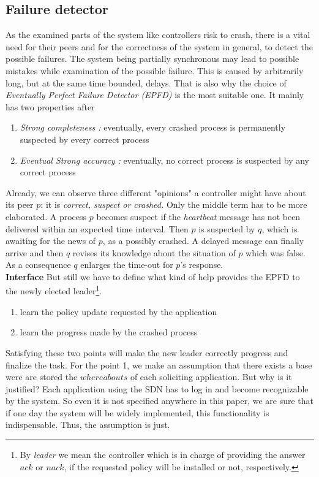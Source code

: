 \documentclass{article}
\theoremstyle{remark}
\begin{document}
\subsection{Failure detector}
As the examined parts of the system like controllers risk to crash, there is a vital need for their peers and for the correctness of the system in general, to detect the possible failures. The system being partially synchronous may lead to possible mistakes while examination of the possible failure. This is caused by arbitrarily long, but at the same time bounded, delays.
That is also why the choice of \emph{Eventually Perfect Failure Detector (EPFD)} is the most suitable one. It mainly has two properties after \cite{Guerraoui:2010:IRD:1951643}
\begin{enumerate}
\item \emph{Strong completeness :} eventually, every crashed process is permanently suspected by every correct process
\item  \emph{Eventual Strong accuracy :} eventually, no correct process is suspected by any correct process
\end{enumerate}
Already, we can observe three different "opinions" a controller might have about its peer $p$: it is \emph{correct, suspect or crashed.} Only the middle term has to be more elaborated. A process $p$ becomes suspect if the \emph{heartbeat} message has not been delivered within an expected time interval. Then $p$ is suspected by $q$, which is awaiting for the news of $p$, as a possibly crashed. A delayed message can finally arrive and then $q$ revises its knowledge about the situation of $p$ which was false. As a consequence $q$ enlarges the time-out for $p$'s response.\\
\textbf{Interface} But still we have to define what kind of help provides the EPFD to the newly elected leader\footnote{By \emph{leader} we mean the controller which is in charge of providing the answer $ack$ or $nack$, if the requested policy will be installed or not, respectively.}.
\begin{enumerate}
\item learn the policy update requested by the application
\item learn the progress made by the crashed process 
\end{enumerate}
Satisfying these two points will make the new leader correctly progress and finalize the task.
For the point 1, we make an assumption that there exists a base were are stored the $whereabouts$ of each soliciting application. But why is it justified? Each application using the SDN has to log in and become recognizable by the system. So even it is not specified anywhere in this paper, we are sure that if one day the system will be widely implemented, this functionality is indispensable. Thus, the assumption is just.\\
\end{document}
